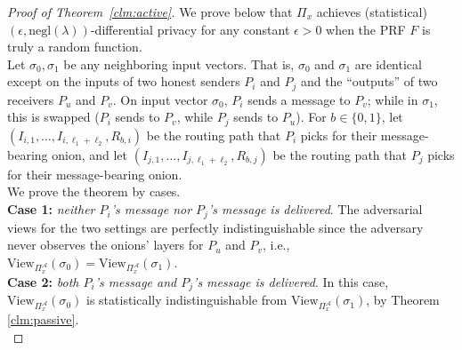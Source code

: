 \begin{proof} [Proof of Theorem~\ref{clm:active}]
We prove below that $\Pi_x$ achieves (statistical) $(\epsilon, \text{negl}(\lambda))$-differential privacy for any constant $\epsilon > 0$ when the PRF $F$ is truly a random function.\\

Let $\sigma_0, \sigma_1$ be any neighboring input vectors. That is, $\sigma_0$ and $\sigma_1$ are identical except on the inputs of two honest senders $P_i$ and $P_j$ and the ``outputs'' of two receivers $P_u$ and $P_v$. On input vector $\sigma_0$, $P_i$ sends a message to $P_v$; while in $\sigma_1$, this is swapped ($P_i$ sends to $P_v$, while $P_j$ sends to $P_u$). For $b \in \{0, 1\}$, let $(I_{i,1}, \dots, I_{i,\ell_1+\ell_2}, R_{b,i})$ be the routing path that $P_i$ picks for their message-bearing onion, and let $(I_{j,1}, \dots, I_{j,\ell_1+\ell_2}, R_{b,j})$ be the routing path that $P_j$ picks for their message-bearing onion.\\

We prove the theorem by cases.\\

\textbf{Case 1:} \textit{neither $P_i$'s message nor $P_j$'s message is delivered}. The adversarial views for the two settings are perfectly indistinguishable since the adversary never observes the onions' layers for $P_u$ and $P_v$, i.e., $\text{View}_{\Pi_x^{\mathcal{A}}}(\sigma_0) = \text{View}_{\Pi_x^{\mathcal{A}}}(\sigma_1)$.\\

\textbf{Case 2:} \textit{both $P_i$'s message and $P_j$'s message is delivered}. In this case, $\text{View}_{\Pi_x^{\mathcal{A}}}(\sigma_0)$ is statistically indistinguishable from $\text{View}_{\Pi_x^{\mathcal{A}}}(\sigma_1)$, by Theorem \ref{clm:passive}.\\


\end{proof}
